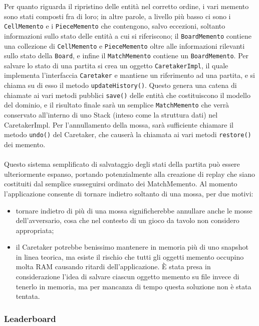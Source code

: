 \documentclass[a4paper,12pt]{report}
\begin{document}
Per quanto riguarda il ripristino delle entità nel corretto ordine, i vari memento sono stati composti fra di loro; in altre parole, a livello più basso ci sono i \texttt{CellMemento} e i \texttt{PieceMemento} che contengono, salvo eccezioni, soltanto informazioni sullo stato delle entità a cui si riferiscono; il \texttt{BoardMemento} contiene una collezione di \texttt{CellMemento} e \texttt{PieceMemento} oltre alle informazioni rilevanti sullo stato della \texttt{Board}, e infine il \texttt{MatchMemento} contiene un \texttt{BoardMemento}. Per salvare lo stato di una partita si crea un oggetto \texttt{CaretakerImpl}, il quale implementa l'interfaccia \texttt{Caretaker} e mantiene un riferimento ad una partita, e si chiama su di esso il metodo \texttt{updateHistory()}. Questo genera una catena di chiamate ai vari metodi pubblici \texttt{save()} delle entità che costituiscono il modello del dominio, e il risultato finale sarà un semplice \texttt{MatchMemento} che verrà conservato all'interno di uno Stack (inteso come la struttura dati) nel CaretakerImpl. Per l'annullamento della mossa, sarà sufficiente chiamare il metodo \texttt{undo()} del Caretaker, che causerà la chiamata ai vari metodi \texttt{restore()} dei memento.
\\\\
Questo sistema semplificato di salvataggio degli stati della partita può essere ulteriormente espanso, portando potenzialmente alla creazione di replay che siano costituiti dal semplice susseguirsi ordinato dei MatchMemento. Al momento l'applicazione consente di tornare indietro soltanto di una mossa, per due motivi:
\begin{itemize}
	\item tornare indietro di più di una mossa significherebbe annullare anche le mosse dell'avversario, cosa che nel contesto di un gioco da tavolo non considero appropriata;
	\item il Caretaker potrebbe benissimo mantenere in memoria più di uno snapshot in linea teorica, ma esiste il rischio che tutti gli oggetti memento occupino molta RAM causando ritardi dell'applicazione. \`E stata presa in considerazione l'idea di salvare ciascun oggetto memento su file invece di tenerlo in memoria, ma per mancanza di tempo questa soluzione non è stata tentata.
\end{itemize}

\subsubsection{Leaderboard}
\end{document}
